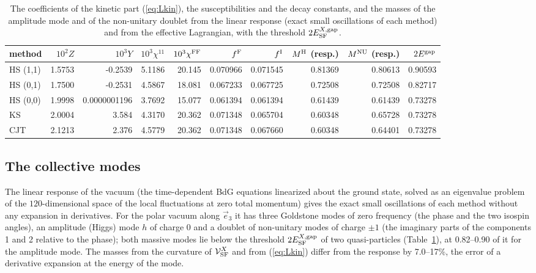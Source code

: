 \documentclass[aps,prd,onecolumn,superscriptaddress,nofootinbib,floatfix,longbibliography]{revtex4-2}
\newcommand{\SF}{{\rm SF}}
\begin{document}
\begin{table}[h]
\caption{\label{tab:kin}The coefficients of the kinetic part (\ref{eq:Lkin}), the susceptibilities and the decay constants, and the
masses of the amplitude mode and of the non-unitary doublet from the linear response (exact small oscillations of each method)
and from the effective Lagrangian, with the threshold $2E^{X,{\rm gap}}_\SF$.}
\begin{ruledtabular}
\begin{tabular}{lrrrrrrrrr}
method & $10^2Z$ & $10^3Y$ & $10^3\chi^{11}$ & $10^3\chi^{\rm FF}$ & $f^{\rm F}$ & $f^{\rm I}$ & $M^{\rm H}$ (resp.) & $M^{\rm NU}$ (resp.) & $2E^{\rm gap}$ \\
\hline
HS (1,1) & 1.5753 & -0.2539 & 5.1186 & 20.145 & 0.070966 & 0.071545 & 0.81369 & 0.80613 & 0.90593 \\
HS (0,1) & 1.7500 & -0.2531 & 4.5867 & 18.081 & 0.067233 & 0.067725 & 0.72508 & 0.72508 & 0.82717 \\
HS (0,0) & 1.9998 & 0.0000001196 & 3.7692 & 15.077 & 0.061394 & 0.061394 & 0.61439 & 0.61439 & 0.73278 \\
KS & 2.0004 & 3.584 & 4.3170 & 20.362 & 0.071348 & 0.065704 & 0.60348 & 0.65728 & 0.73278 \\
CJT & 2.1213 & 2.376 & 4.5779 & 20.362 & 0.071348 & 0.067660 & 0.60348 & 0.64401 & 0.73278 \\
\end{tabular}
\end{ruledtabular}
\end{table}

\subsection{The collective modes}

The linear response of the vacuum (the time-dependent BdG equations linearized about the ground state, solved as an
eigenvalue problem of the $120$-dimensional space of the local fluctuations at zero total momentum) gives the exact small
oscillations of each method without any expansion in derivatives. For the polar vacuum along $\vec e_3$ it has three Goldstone
modes of zero frequency (the phase and the two isospin angles), an amplitude (Higgs) mode $h$ of charge 0 and a doublet of
non-unitary modes of charge $\pm1$ (the imaginary parts of the components 1 and 2 relative to the phase); both massive modes lie
below the threshold $2E^{X,{\rm gap}}_\SF$ of two quasi-particles (Table~\ref{tab:kin}), at 0.82\mbox{--}0.90 of it for the amplitude
mode. The masses from the curvature of $\mathcal V^X_\SF$ and from (\ref{eq:Lkin}) differ from the response by 7.0\mbox{--}17\%, the error
of a derivative expansion at the energy of the mode.
\end{document}
